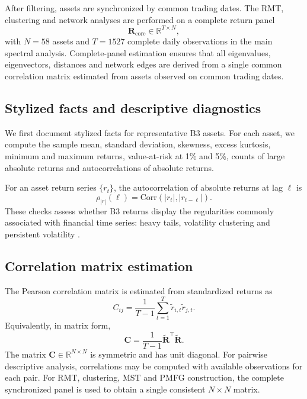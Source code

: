 After filtering, assets are synchronized by common trading dates. The RMT, clustering and network analyses are performed on a complete return panel
\begin{equation}
\mathbf{R}_{\mathrm{core}}
\in
\mathbb{R}^{T \times N},
\end{equation}
with $N=58$ assets and $T=1527$ complete daily observations in the main spectral analysis. Complete-panel estimation ensures that all eigenvalues, eigenvectors, distances and network edges are derived from a single common correlation matrix estimated from assets observed on common trading dates.

\subsection{Stylized facts and descriptive diagnostics}
\label{subsec:stylized_method}

We first document stylized facts for representative B3 assets. For each asset, we compute the sample mean, standard deviation, skewness, excess kurtosis, minimum and maximum returns, value-at-risk at 1\% and 5\%, counts of large absolute returns and autocorrelations of absolute returns.

For an asset return series $\{r_t\}$, the autocorrelation of absolute returns at lag $\ell$ is
\begin{equation}
\rho_{|r|}(\ell)
=
\mathrm{Corr}(|r_t|, |r_{t-\ell}|).
\end{equation}
These checks assess whether B3 returns display the regularities commonly associated with financial time series: heavy tails, volatility clustering and persistent volatility \cite{cont_2001_empirical}.

\subsection{Correlation matrix estimation}
\label{subsec:correlation_method}

The Pearson correlation matrix is estimated from standardized returns as
\begin{equation}
C_{ij}
=
\frac{1}{T-1}
\sum_{t=1}^{T}
\tilde{r}_{i,t}\tilde{r}_{j,t}.
\end{equation}
Equivalently, in matrix form,
\begin{equation}
\mathbf{C}
=
\frac{1}{T-1}
\widetilde{\mathbf{R}}^{\top}
\widetilde{\mathbf{R}}.
\end{equation}
The matrix $\mathbf{C}\in\mathbb{R}^{N\times N}$ is symmetric and has unit diagonal. For pairwise descriptive analysis, correlations may be computed with available observations for each pair. For RMT, clustering, MST and PMFG construction, the complete synchronized panel is used to obtain a single consistent $N\times N$ matrix.

